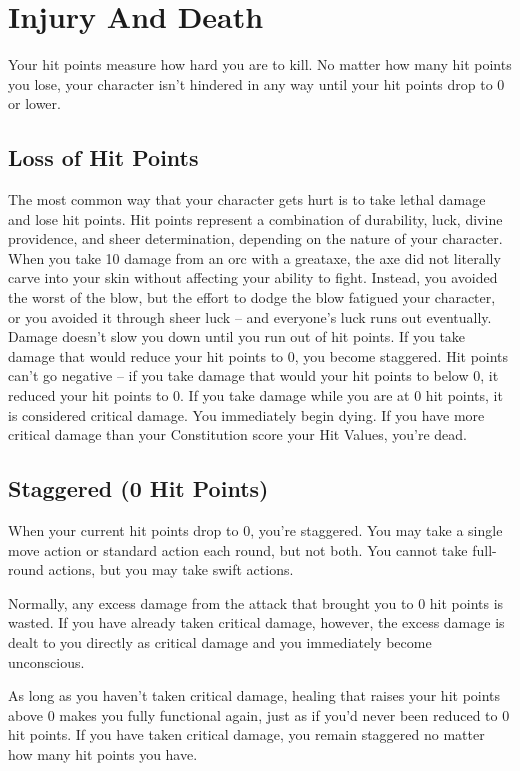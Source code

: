\section{Injury And Death}
Your hit points measure how hard you are to kill. No matter how many hit points you lose, your character isn't hindered in any way until your hit points drop to 0 or lower.

\subsection{Loss of Hit Points}
The most common way that your character gets hurt is to take lethal damage and lose hit points.
 Hit points represent a combination of durability, luck, divine providence, and sheer determination, depending on the nature of your character. When you take 10 damage from an orc with a greataxe, the axe did not literally carve into your skin without affecting your ability to fight. Instead, you avoided the worst of the blow, but the effort to dodge the blow fatigued your character, or you avoided it through sheer luck -- and everyone's luck runs out eventually.
 Damage doesn't slow you down until you run out of hit points. If you take damage that would reduce your hit points to 0, you become staggered. Hit points can't go negative -- if you take damage that would your hit points to below 0, it reduced your hit points to 0.
 If you take damage while you are at 0 hit points, it is considered critical damage. You immediately begin dying. If you have more critical damage than your Constitution score \add your Hit Values, you're dead.

\subsection{Staggered (0 Hit Points)}
When your current hit points drop to 0, you're staggered. You may take a single move action or standard action each round, but not both. You cannot take full-round actions, but you may take swift actions.

Normally, any excess damage from the attack that brought you to 0 hit points is wasted. If you have already taken critical damage, however, the excess damage is dealt to you directly as critical damage and you immediately become unconscious.

As long as you haven't taken critical damage, healing that raises your hit points above 0 makes you fully functional again, just as if you'd never been reduced to 0 hit points. If you have taken critical damage, you remain staggered no matter how many hit points you have.

